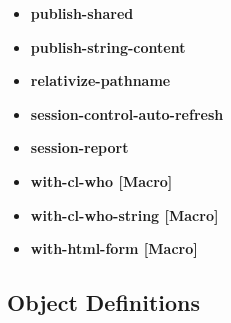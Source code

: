 \documentclass [11pt]{book}
\begin{document}
\begin{itemize}
\item {}
\label{prim:publish-shared}
\textbf{publish-shared}





\item {}
\label{prim:publish-string-content}
\textbf{publish-string-content}





\item {}
\label{prim:relativize-pathname}
\textbf{relativize-pathname}





\item {}
\label{prim:session-control-auto-refresh}
\textbf{session-control-auto-refresh}





\item {}
\label{prim:session-report}
\textbf{session-report}





\item {}
\label{prim:with-cl-who}
\textbf{with-cl-who [Macro]}





\item {}
\label{prim:with-cl-who-string}
\textbf{with-cl-who-string [Macro]}





\item {}
\label{prim:with-html-form}
\textbf{with-html-form [Macro]}





\end{itemize}



\subsection{Object Definitions}
\end{document}
